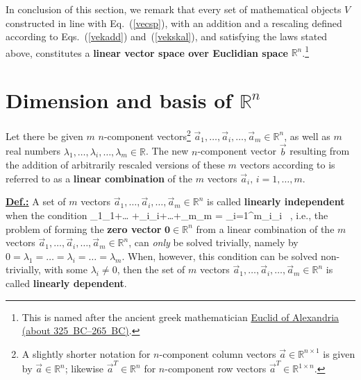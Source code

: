\medskip
\noindent
In conclusion of this section, we remark that every set of 
mathematical objects $V$ constructed in line with 
Eq.~(\ref{vecsp}), with an addition and a rescaling defined 
according to Eqs.~(\ref{vekadd}) and~(\ref{vekskal}), and 
satisfying the laws stated above, constitutes a {\bf linear vector 
space over Euclidian space} ${\mathbb R}^{n}$.\footnote{This is 
named after the ancient greek mathematician
\href{http://www-groups.dcs.st-and.ac.uk/~history/Biographies/Euclid.html}{Euclid of Alexandria (about 325~BC--265~BC)}.}

\section[Dimension and basis of ${\mathbb R}^{n}$]%
{Dimension and basis of ${\mathbb R}^{n}$}
Let there be given $m$ $n$-component vectors\footnote{A slightly
shorter notation for $n$-component column vectors $\vec{a} \in 
\mathbb{R}^{n\times 1}$ is given by $\vec{a} \in \mathbb{R}^{n}$; 
likewise $\vec{a}^{T} \in \mathbb{R}^{n}$ for $n$-component row 
vectors $\vec{a}^{T} \in \mathbb{R}^{1\times n}$.} $\vec{a}_{1}, 
\ldots, \vec{a}_{i}, \ldots, \vec{a}_{m} \in {\mathbb R}^{n}$, as 
well as $m$ real numbers $\lambda_{1}, \ldots, \lambda_{i}, 
\ldots, \lambda_{m} \in {\mathbb R}$. The new $n$-component vector 
$\vec{b}$ resulting from the addition of arbitrarily rescaled 
versions of these $m$ vectors according to
%
\be
{}
\ee
%
is referred to as a {\bf linear combination} 
of the $m$ vectors $\vec{a}_{i},\,i=1, \ldots, m$.

\medskip
\noindent
\underline{\bf Def.:} A set of $m$ vectors $\vec{a}_{1}, \ldots,
\vec{a}_{i}, \ldots, \vec{a}_{m} \in {\mathbb R}^{n}$ is called 
{\bf linearly independent} when the condition
%
\be
{}
 \stackrel{!}{=} \lambda_{1}_{1}+\ldots
+\lambda_{i}_{i}+\ldots+\lambda_{m}_{m}
= \sum_{i=1}^{m}\lambda_{i}_{i} \ ,
\ee
%
i.e., the problem of forming the {\bf zero vector} $\boldsymbol{0} 
\in {\mathbb R}^{n}$ from a linear combination of the $m$ vectors 
$\vec{a}_{1}, \ldots, \vec{a}_{i}, \ldots, \vec{a}_{m} \in 
{\mathbb R}^{n}$, can \emph{only} be solved trivially, namely by 
$0=\lambda_{1}=\ldots=\lambda_{i}=\ldots=\lambda_{m}$. When, 
however, this condition can be solved non-trivially, with some 
$\lambda_{i} \neq 0$, then the set of $m$ vectors $\vec{a}_{1},
\ldots, \vec{a}_{i}, \ldots,\vec{a}_{m} \in {\mathbb R}^{n}$ is 
called {\bf linearly dependent}.


